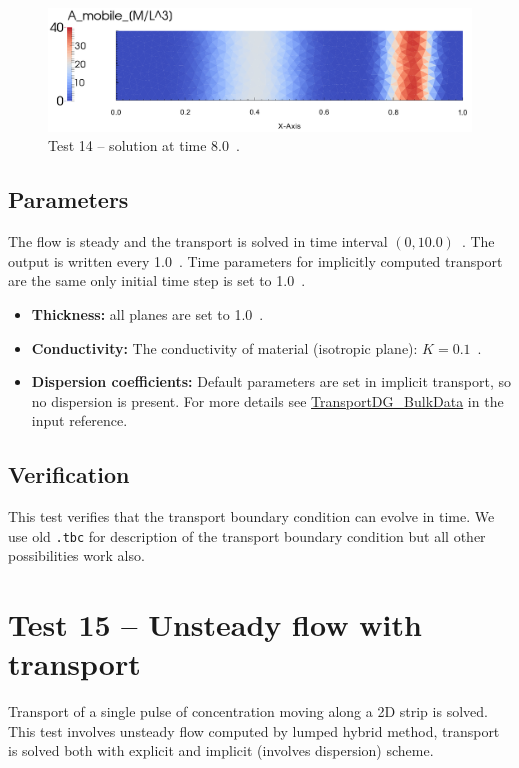 \begin{figure}[htb!]
\centering
\includegraphics[width=15cm]{tests_graphics/14_solution.pdf}
\caption{Test 14 -- solution at time 8.0~.}
\label{fig:test14_mesh}
\end{figure}
%
%
\subsection*{Parameters}
The flow is steady and the transport is solved in time interval $(0,10.0)$~. The output is written every 
1.0~. Time parameters for implicitly computed transport are the same only initial time step is set to 1.0~.
%
\begin{itemize}
  \item \textbf{Thickness:} all planes are set to 1.0~.
  \item \textbf{Conductivity:} The conductivity of material (isotropic plane): $K=0.1$~.
  \item \textbf{Dispersion coefficients:} Default parameters are set in implicit transport, so no dispersion is present. 
        For more details see \hyperlink{IT::TransportDG-BulkData}{TransportDG\_BulkData} in the input reference.
\end{itemize}
%

\subsection*{Verification}
This test verifies that the transport boundary condition can evolve in time. We use old \verb'.tbc' for description 
of the transport boundary condition but all other possibilities work also.



\section{Test 15 -- Unsteady flow with transport}
Transport of a single pulse of concentration moving along a 2D strip is solved. This test involves unsteady flow computed by lumped hybrid method, transport is solved both with explicit and implicit (involves dispersion) scheme.
 
